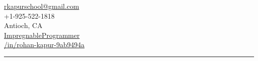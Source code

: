 \documentclass[letterpaper,10pt]{article}
\begin{document}
\begin{multicols}{3}
\begin{minipage}{.33\textwidth}
\begin{flushright}
      \faEnvelope\hspace{4px}\href{mailto:rkapurschool@gmail.com}{rkapurschool@gmail.com} \\
      \vspace{1em}
      \faMobile*\hspace{4px}+1-925-522-1818 \\
      \vspace{1em}
      \faLocationArrow\hspace{4px}Antioch, CA \\
      \vspace{1em}
      \faGithub\hspace{4px}\href{https://github.com/ImpregnableProgrammer}{ImpregnableProgrammer} \\
      \vspace{1em}
      \faLinkedin\hspace{4px}\href{https://www.linkedin.com/in/rohan-kapur-9ab9494a}{/in/rohan-kapur-9ab9494a}
    \end{flushright}
  \end{minipage}
\end{multicols}
{\color{magenta}\hrule}
\vspace{.5em}
\end{document}
